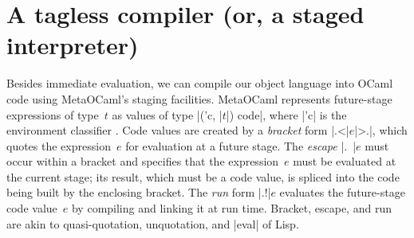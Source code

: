 \begin{comment}
\begin{code}
module EX1(S: Symantics) = struct
 open S
 let tfix () = app (fix (fun self -> self)) (int 1)
end;;
let module E =EX1(R) in E.tfix ();;
let module E =EX1(L) in E.tfix ();;
\end{code}
\end{comment}

\section{A tagless compiler (or, a staged interpreter)}\label{compiler}
Besides immediate evaluation, we can compile our object language
into OCaml code using MetaOCaml's staging facilities. MetaOCaml
represents future-stage expressions of type~$t$
as values of type |('c, |$t$|) code|, where |'c| is the
environment classifier \citep{WalidPOPL03,calcagno-ml-like}. Code values are created
by a \emph{bracket} form |.<|$e$|>.|, which quotes the expression~$e$ for
evaluation at a future stage. The \emph{escape} |.~|$e$ must occur
within a bracket and specifies that the expression~$e$ must be evaluated
at the current stage; its result, which must be a code value, is
spliced into the code being built by the enclosing bracket. The \emph{run} form |.!|$e$ evaluates
the future-stage code value~$e$ by compiling and linking it at run time.
Bracket, escape, and run are akin to
quasi-quotation, unquotation, and |eval| of Lisp.

